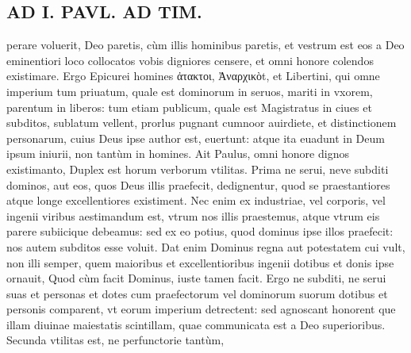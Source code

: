 \documentclass{article}
\begin{document}
\begin{pages}
\section*{AD I. PAVL. AD TIM. }
\marginpar{[ p.414 ]}\pstart perare voluerit, Deo paretis, cùm illis hominibus paretis, et vestrum est eos a Deo eminentiori loco collocatos vobis digniores censere, et omni honore colendos existimare. Ergo Epicurei homines ἀτακτοι, Ἀναρχικὸt, et Libertini, qui omne imperium tum priuatum, quale est dominorum in seruos, mariti in vxorem, parentum in liberos: tum etiam publicum, quale est Magistratus in ciues et subditos, sublatum vellent, prorlus pugnant cumnoor auirdiete, et distinctionem personarum, cuius Deus ipse author est, euertunt: atque ita euadunt in Deum ipsum iniurii, non tantùm in homines.  \pend\pstart Ait Paulus, omni honore dignos existimanto, Duplex est horum verborum vtilitas. Prima ne serui, neve subditi dominos, aut eos, quos Deus illis praefecit, dedignentur, quod se praestantiores atque longe excellentiores existiment. Nec enim ex industriae, vel corporis, vel ingenii viribus aestimandum est, vtrum nos illis praestemus, atque vtrum eis parere subiicique debeamus: sed ex eo potius, quod dominus ipse illos praefecit: nos autem subditos esse voluit. Dat enim Dominus regna aut potestatem cui vult, non illi semper, quem maioribus et excellentioribus ingenii dotibus et donis ipse ornauit, Quod cùm facit Dominus, iuste tamen facit. Ergo ne subditi, ne serui suas et personas et dotes cum praefectorum vel dominorum suorum dotibus et personis comparent, vt eorum imperium detrectent: sed agnoscant honorent que illam diuinae maiestatis scintillam, quae communicata est a Deo superioribus.  \pend\pstart Secunda vtilitas est, ne perfunctorie tantùm,  \pend

\end{pages}
\end{document}
